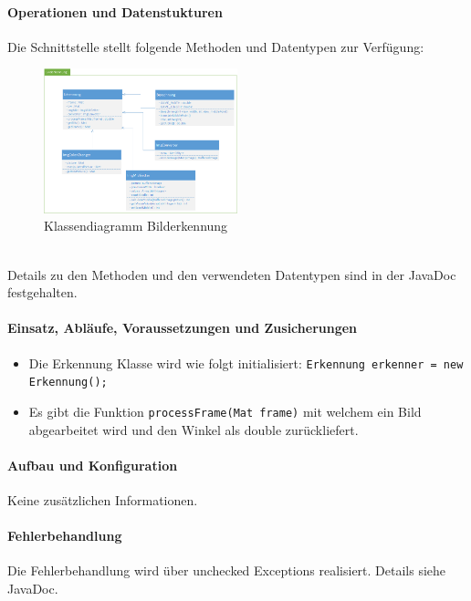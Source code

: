 \paragraph{Operationen und Datenstukturen}

Die Schnittstelle stellt folgende Methoden und Datentypen zur Verfügung:  \\
\begin{figure}[h!]          
	\centering             
	\includegraphics[width=0.5\textwidth]{fig/Klassendiagramm_Erkennung.png}
	\caption{Klassendiagramm Bilderkennung}
	\label{fig:Klassendiagramm Bilderkennung}        
\end{figure} \\
Details zu den Methoden und den verwendeten Datentypen sind in der JavaDoc festgehalten. \\

\paragraph{Einsatz, Abläufe, Voraussetzungen und Zusicherungen}
\begin{itemize}
	\item{Die Erkennung Klasse wird wie folgt initialisiert: \verb?Erkennung erkenner = new Erkennung();? }
	\item{Es gibt die Funktion \verb?processFrame(Mat frame)? mit welchem ein Bild abgearbeitet wird und den Winkel als double zurückliefert.}
\end{itemize}

\paragraph{Aufbau und Konfiguration} 
Keine zusätzlichen Informationen. \\

\paragraph{Fehlerbehandlung}
Die Fehlerbehandlung wird über unchecked Exceptions realisiert. Details siehe JavaDoc. \\

